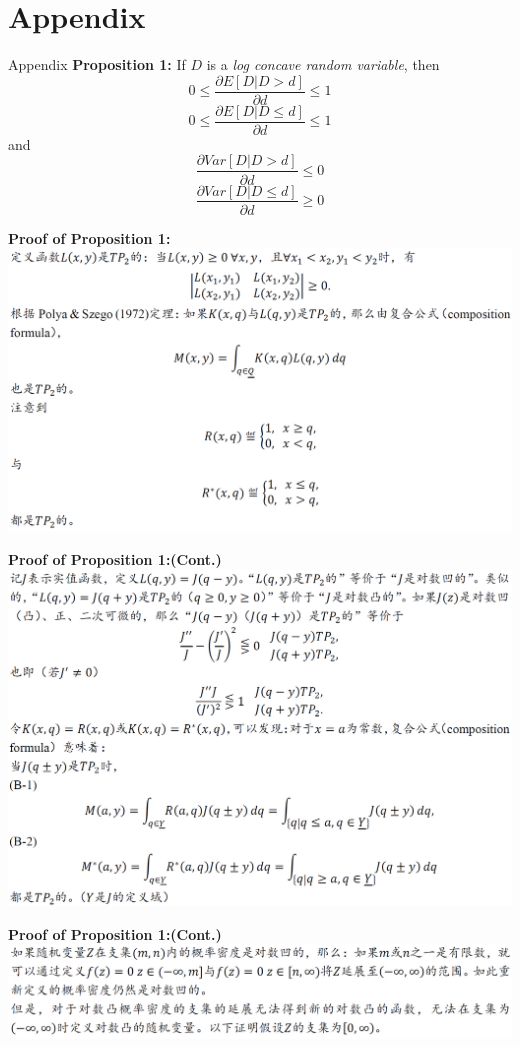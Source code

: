 \documentclass{beamer}
\begin{document}
\section{Appendix}
\begin{frame}{Appendix}
\textbf{Proposition 1:} If $D$ is a \textit{log concave random variable}, then
$$0\leq \frac{\partial E[D|D>d]}{\partial d}\leq 1 $$
$$0\leq \frac{\partial E[D|D\leq d]}{\partial d}\leq 1 $$
and
$$\frac{\partial Var[D|D>d]}{\partial d}\leq 0 $$
$$\frac{\partial Var[D|D\leq d]}{\partial d}\geq 0 $$
\end{frame}
\begin{frame}
	\textbf{Proof of Proposition 1:}
	\includegraphics[scale=0.5]{proposition1_1}
\end{frame}
\begin{frame}
	\textbf{Proof of Proposition 1:(Cont.)}
	\includegraphics[scale=0.5]{proposition1_2}
\end{frame}
\begin{frame}
	\textbf{Proof of Proposition 1:(Cont.)}
	\includegraphics[scale=0.5]{proposition1_3}
\end{frame}
\end{document}
